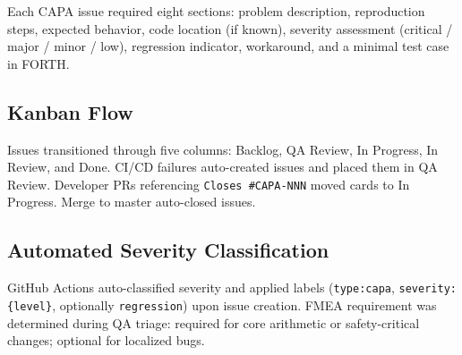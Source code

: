 Each CAPA issue required eight sections: problem description, reproduction
steps, expected behavior, code location (if known), severity assessment
(critical / major / minor / low), regression indicator, workaround, and
a minimal test case in FORTH.

\subsection{Kanban Flow}

Issues transitioned through five columns: Backlog, QA Review, In Progress,
In Review, and Done. CI/CD failures auto-created issues and placed them in
QA Review. Developer PRs referencing \texttt{Closes \#CAPA-NNN} moved cards
to In Progress. Merge to master auto-closed issues.

\subsection{Automated Severity Classification}

GitHub Actions auto-classified severity and applied labels
(\texttt{type:capa}, \texttt{severity:\{level\}}, optionally
\texttt{regression}) upon issue creation. FMEA requirement was determined
during QA triage: required for core arithmetic or safety-critical changes;
optional for localized bugs.

